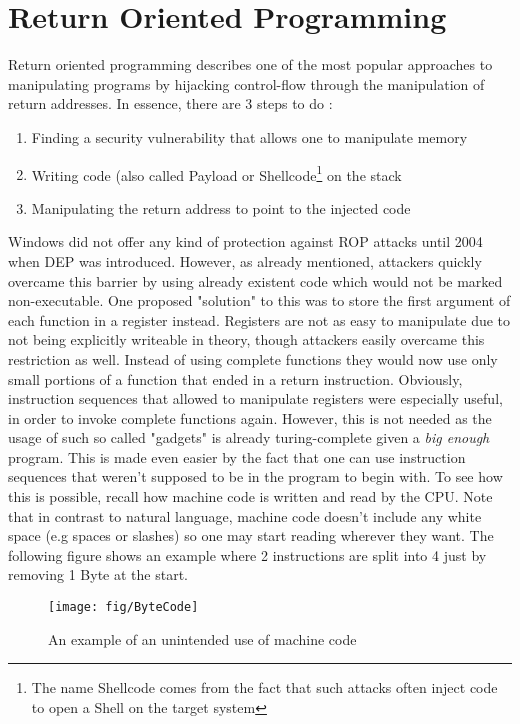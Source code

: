 \documentclass[10pt,twocolumn,a4paper]{article}
\begin{document}
\section{Return Oriented Programming}\label{ROP}
Return oriented programming describes one of the most popular approaches to manipulating programs by hijacking control-flow through the manipulation of return addresses.
In essence, there are 3 steps to do :
\begin{enumerate}
	\item Finding a security vulnerability that allows one to manipulate memory
	\item Writing code (also called Payload or Shellcode\footnote{The name Shellcode comes from the fact that such attacks often inject code to open a Shell on the target system} on the stack 
	\item Manipulating the return address to point to the injected code
\end{enumerate}
Windows did not offer any kind of protection against ROP attacks until 2004 when DEP was introduced.
However, as already mentioned, attackers quickly overcame this barrier by using already existent code which would not be marked non-executable.
One proposed "solution" to this was to store the first argument of each function in a register instead. Registers are not as easy to manipulate due to not being explicitly writeable in theory, though attackers easily overcame this restriction as well.
Instead of using complete functions they would now use only small portions of a function that ended in a return instruction. Obviously, instruction sequences that allowed to manipulate registers were especially useful, in order to invoke complete functions again.
However, this is not needed as the usage of such so called "gadgets" is already turing-complete given a \emph{big enough}\cite{gadgets} program.
This is made even easier by the fact that one can use instruction sequences that weren't supposed to be in the program to begin with.
To see how this is possible, recall how machine code is written and read by the CPU.
Note that in contrast to natural language, machine code doesn't include any white space (e.g spaces or slashes) so one may start reading wherever they want.
The following figure shows an example where 2 instructions are split into 4 just by removing 1 Byte at the start.
\begin{figure}[htbp]
  \texttt{[image: fig/ByteCode]}
  \caption{An example of an unintended use of machine code \cite{geometry}}
\end{figure}
\end{document}
